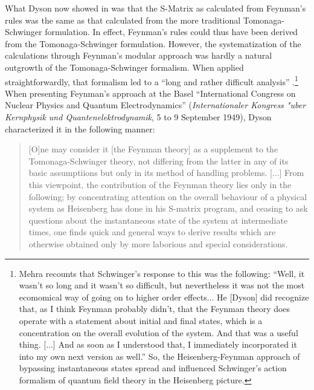 \documentclass[12pt,a4paper]{article}
\begin{document}
What Dyson now showed in \citep{dyson_1949_the-radiation} was that the S-Matrix as calculated from Feynman's rules was the same as that calculated from the more traditional Tomonaga-Schwinger formulation. In effect, Feynman's rules could thus have been derived from the Tomonaga-Schwinger formulation. However, the systematization of the calculations through Feynman's modular approach was hardly a natural outgrowth of the Tomonaga-Schwinger formalism. When applied straightforwardly, that formalism led to a ``long and rather difficult analysis'' \citep[p. 491]{dyson_1949_the-radiation}.\footnote{Mehra recounts that Schwinger's response to this was the following: ``Well, it wasn't so long and it wasn't so difficult, but nevertheless it was not the most ecomomical way of going on to higher order effects... He [Dyson] did recognize that, as I think Feynman probably didn't, that the Feynman theory does operate with a statement about initial and final states, which is a concentration on the overall evolution of the system. And that was a useful thing. [...] And as soon as I understood that, I immediately incorporated it into my own next version as well.'' \citep[p. 288n]{mehra_2000_climbing} So, the Heisenberg-Feynman approach of bypassing instantaneous states spread and influenced Schwinger's action formalism of quantum field theory in the Heisenberg picture.}  When presenting Feynman's approach at the Basel ``International Congress on Nuclear Physics and Quantum Electrodynamics'' (\emph{Internationaler Kongress "uber Kernphysik und Quantenelektrodynamik}, 5 to 9 September 1949), Dyson characterized it in the following manner:

\begin{quote}
[O]ne may consider it [the Feynman theory] as a supplement to the Tomonaga-Schwinger theory, not differing from the latter in any of its basic assumptiions but only in its method of handling problems. [...] From this viewpoint, the contribution of the Feynman theory lies only in the following; by concentrating attention on the overall behaviour of a physical system as Heisenberg has done in his S-matrix program, and ceasing to ask questions about the instantaneous state of the system at intermediate times, one finds quick and general ways to derive results which are otherwise obtained only by more laborious and special considerations.\citep[p. 240]{dyson_1950_the-radiation}
\end{quote}
\end{document}
